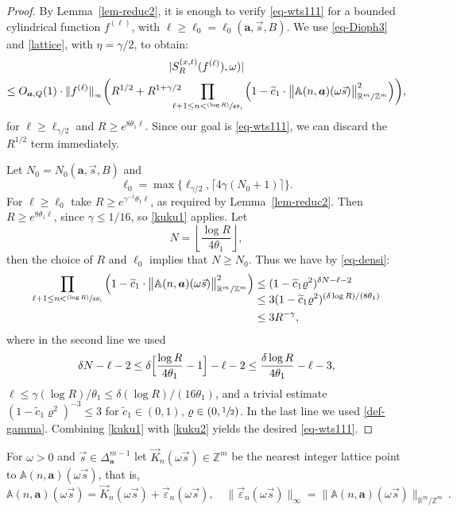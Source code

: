 \documentclass[JEP,XML,SOM,Unicode]{cedram}
\newcommand\shalf{\sfrac{1}{2}}
\newcommand{\psfrac}[2]{\sfrac{(#1)}{#2}}
\theoremstyle{plain}
\theoremstyle{definition}
\let\wt\widetilde
\newcommand\bom{{\boldsymbol a}}\let\ba\bom
\let\eps\varepsilon
\let\gam\gamma
\let\om\omega
\newcommand\Aa{\mathbb{A}}
\newcommand{\R}{\mathbb{R}}
\newcommand{\Z}{\mathbb{Z}}
\newcommand\be{\begin{equation}}
\newcommand\ee{\end{equation}}
\begin{document}
\begin{proof}
By Lemma~\ref{lem-reduc2}, it is enough to verify \eqref{eq-wts111} for a bounded cylindrical function $f^{(\ell)}$, with $\ell \ge \ell_0=\ell_0(\bom,\vec s, B)$.
We use \eqref{eq-Dioph3} and \eqref{lattice}, with $\eta = \gam/2$, to obtain:
\begin{multline}
\label{kuku1}
|S^{(x,t)}_R(f^{(\ell)}),\om)|\\
\le O_{\bom,Q}(1)\cdot \|f^{(\ell)}\|_{_\infty} \biggl(R^{1/2}+ R^{1+\gam/2}\!\!\!\!\!\!\prod_{\ell+1\le n < \psfrac{\log R}{4\theta_1}}
\left( 1 - \wt c_1\cdot \bigl\|\Aa(n,\bom) (\om\vec{s})\bigr\|^2_{\R^m/\Z^m} \right)
\biggr),
\end{multline}
for $\ell\ge \ell_{\gam/2}$ and
$R\ge e^{8\theta_1\ell}$.
Since our goal is \eqref{eq-wts111},
we can discard the $R^{1/2}$ term immediately.

Let $N_0 = N_0(\bom,\vec s, B)$ and
\[
\ell_0 =\max\{ \ell_{\gam/2}, \lceil 4\gam (N_0+1)\rceil\}.
\]
For $\ell\ge \ell_0$ take $R\ge e^{\gam^{-1}\theta_1 \ell}$, as required by Lemma~\ref{lem-reduc2}. Then $R\ge e^{8\theta_1\ell}$, since $\gam\le 1/16$, so \eqref{kuku1} applies.
Let
\[
N = \left\lfloor\frac{\log R}{4\theta_1}\right\rfloor,
\]
then the choice of $R$ and $\ell_0$ implies that $N\ge N_0$. Thus we have by \eqref{eq-densi}:
\begin{equation}
\label{kuku2}
\begin{split}
\prod_{\ell+1\le n < \psfrac{\log R}{4\theta_1}}
\left( 1 - \wt c_1\cdot \bigl\|\Aa(n,\bom) (\om\vec{s})\bigr\|^2_{\R^m/\Z^m} \right)
& \le (1-\wt c_1 \varrho^2)^{\delta N-\ell-2} \\[-3.3ex]
& \le 3 (1-\wt c_1 \varrho^2)^{(\delta \log R)/(8\theta_1)} \\
& \le 3 R^{-\gam}, 
\end{split}
\end{equation}
where in the second line we used
\[
\delta N - \ell - 2 \le \delta \Bigl[\frac{\log R}{4\theta_1} - 1\Bigr] -\ell-2 \le \frac{\delta\log R}{4\theta_1} - \ell- 3,
\]
$\ell\le\gam(\log R)/\theta_1\le\delta(\log R)/(16\theta_1)$, and a trivial estimate $(1-\wt c_1 \varrho^2)^{-3}\le3$ for \hbox{$\wt c_1\in(0,1)$}, $\varrho\in (0,\shalf)$. In the last line we used \eqref{def-gamma}.
Combining \eqref{kuku1} with \eqref{kuku2} yields the desired \eqref{eq-wts111}.
\end{proof}

For $\om >0$ and $\vec s\in \Delta_\bom^{m-1}$ let $\vec K_n(\om\vec s)\in \Z^m$ be the nearest integer lattice point to $\Aa(n,\bom) (\om\vec{s})$, that is,
\be \label{def-eps}
\Aa(n,\bom) (\om\vec{s}) = \vec{K}_n(\om\vec s) + \vec{\eps}_n(\om\vec s),\quad \|\vec{\eps}_n(\om\vec s)\|_\infty = \bigl\|\Aa(n,\bom) (\om\vec{s})\bigr\|_{\R^m/\Z^m}\,.
\ee
\end{document}
